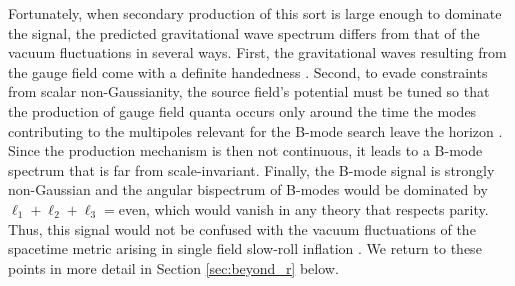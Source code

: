 Fortunately, when secondary production of this sort is large enough to dominate the signal, the predicted gravitational wave spectrum differs from that of the vacuum fluctuations in several ways. First, the gravitational waves resulting from the gauge field come with a definite handedness \cite{Anber:2006xt,Sorbo:2011rz}. Second, to evade constraints from scalar non-Gaussianity, the source field's potential must be tuned so that the production of gauge field quanta occurs only around the time the modes contributing to the multipoles relevant for the B-mode search leave the horizon \cite{Namba:2015gja}. Since the production mechanism is then not continuous, it leads to a B-mode spectrum that is far from scale-invariant. Finally, the B-mode signal is strongly non-Gaussian and the angular bispectrum of B-modes would be dominated by $\ell_1+\ell_2+\ell_3=$even, which would vanish in any theory that respects parity. Thus, this signal would not be confused with the vacuum fluctuations of the spacetime metric arising in single field slow-roll inflation \cite{Namba:2015gja}. We return to these points in more detail in Section \ref{sec:beyond_r} below.
 


